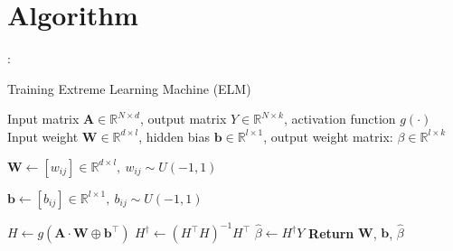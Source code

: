 \section{Algorithm}\label{sec:algorithm}: 
\begin{algorithm}
  \caption{Training Extreme Learning Machine (ELM)}
  \label{elm_training_algorithm}
  \begin{algorithmic}[1]
    \renewcommand{\algorithmicrequire}{\textbf{Input:}}
    \renewcommand{\algorithmicensure}{\textbf{Output:}}
    \Require Input matrix $\mathbf{A} \in \mathbb{R}^{N \times d}$, output matrix $Y \in \mathbb{R}^{N \times k}$, activation function $g(\cdot)$
    \Ensure Input weight $\mathbf{W} \in \mathbb{R}^{d \times l}$, hidden bias $\mathbf{b} \in \mathbb{R}^{l \times 1}$, output weight matrix: $\beta \in \mathbb{R}^{l \times k}$

    \State $\mathbf{W}\gets [w_{ij}] \in \mathbb{R}^{d \times l},\  w_{ij} \sim U(-1, 1)$
    
    \State $\mathbf{b}\gets [b_{ij}] \in \mathbb{R}^{l \times 1},\  b_{ij} \sim U(-1, 1)$ 
    
    \State$H \gets g(\mathbf{A} \cdot \mathbf{W} \oplus \mathbf{b}^\top)$
    \State $H^\dagger \gets (H^\top  H)^{-1}  H^\top$
    \State $\hat{\beta} \gets H^\dagger Y$
    \State \textbf{Return} $\mathbf{W}$, $\mathbf{b}$, $\hat{\beta}$
  \end{algorithmic}
\end{algorithm}

 
